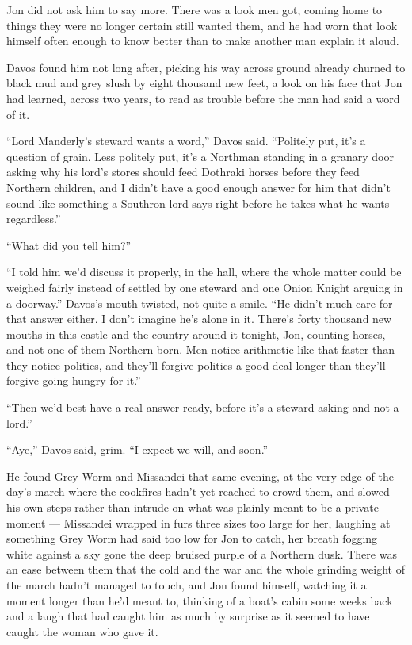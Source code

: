 Jon did not ask him to say more. There was a look men got, coming home to things they were no longer certain still wanted them, and he had worn that look himself often enough to know better than to make another man explain it aloud.

\sceneBreak

Davos found him not long after, picking his way across ground already churned to black mud and grey slush by eight thousand new feet, a look on his face that Jon had learned, across two years, to read as trouble before the man had said a word of it.

“Lord Manderly’s steward wants a word,” Davos said. “Politely put, it’s a question of grain. Less politely put, it’s a Northman standing in a granary door asking why his lord’s stores should feed Dothraki horses before they feed Northern children, and I didn’t have a good enough answer for him that didn’t sound like something a Southron lord says right before he takes what he wants regardless.”

“What did you tell him?”

“I told him we’d discuss it properly, in the hall, where the whole matter could be weighed fairly instead of settled by one steward and one Onion Knight arguing in a doorway.” Davos’s mouth twisted, not quite a smile. “He didn’t much care for that answer either. I don’t imagine he’s alone in it. There’s forty thousand new mouths in this castle and the country around it tonight, Jon, counting horses, and not one of them Northern-born. Men notice arithmetic like that faster than they notice politics, and they’ll forgive politics a good deal longer than they’ll forgive going hungry for it.”

“Then we’d best have a real answer ready, before it’s a steward asking and not a lord.”

“Aye,” Davos said, grim. “I expect we will, and soon.”

\sceneBreak

He found Grey Worm and Missandei that same evening, at the very edge of the day’s march where the cookfires hadn’t yet reached to crowd them, and slowed his own steps rather than intrude on what was plainly meant to be a private moment — Missandei wrapped in furs three sizes too large for her, laughing at something Grey Worm had said too low for Jon to catch, her breath fogging white against a sky gone the deep bruised purple of a Northern dusk. There was an ease between them that the cold and the war and the whole grinding weight of the march hadn’t managed to touch, and Jon found himself, watching it a moment longer than he’d meant to, thinking of a boat’s cabin some weeks back and a laugh that had caught him as much by surprise as it seemed to have caught the woman who gave it.

